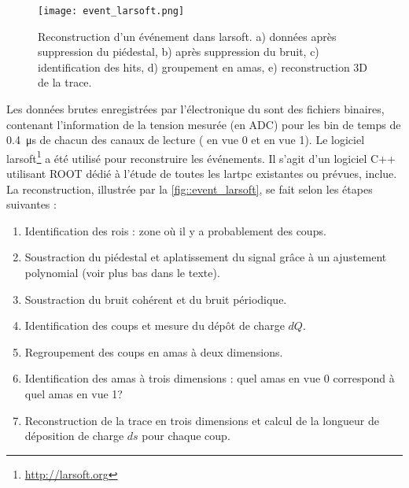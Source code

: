         \begin{figure}[htbp]
          \centering
          \texttt{[image: event\_larsoft.png]}
          \caption[Reconstruction d'un événement dans LArSoft]{\label{fig::event_larsoft}Reconstruction d'un événement dans \gls{larsoft}. a) données après suppression du piédestal, b) après suppression du bruit, c) identification des hits, d) groupement en amas, e) reconstruction 3D de la trace.}
        \end{figure}
        Les données brutes enregistrées par l'électronique du \TOO{} sont des fichiers binaires, contenant l'information de la tension mesurée (en ADC) pour les  bin de temps de \SI{0.4}{\micro\second} de chacun des  canaux de lecture ( en vue 0 et  en vue 1). Le logiciel \gls{larsoft}\footnote{\url{http://larsoft.org}} a été utilisé pour reconstruire les événements. Il s'agit d'un logiciel C++ utilisant ROOT dédié à l'étude de toutes les \gls{lartpc} existantes ou prévues, \protodp{} inclue.  La reconstruction, illustrée par la \autoref{fig::event_larsoft}, se fait selon les étapes suivantes :
        \begin{enumerate}
          \item Identification des \glspl{roi} : zone où il y a probablement des coups.
          \item Soustraction du piédestal et aplatissement du signal grâce à un ajustement polynomial (voir plus bas dans le texte).
          \item Soustraction du bruit cohérent et du bruit périodique.
          \item Identification des coups et mesure du dépôt de charge $dQ$.
          \item Regroupement des coups en amas à deux dimensions.
          \item Identification des amas à trois dimensions : quel amas en vue 0 correspond à quel amas en vue 1?
          \item Reconstruction de la trace en trois dimensions et calcul de la longueur de déposition de charge $ds$ pour chaque coup.
        \end{enumerate}
